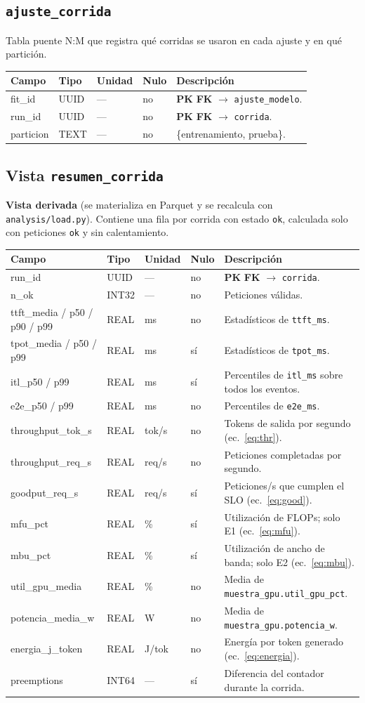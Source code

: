 \documentclass[11pt,a4paper]{article}
\makeatletter
\newcommand{\PK}{\textcolor{pkc}{\textbf{PK}}}
\newcommand{\FK}{\textcolor{fkc}{\textbf{FK}}}
\newenvironment{diccionario}{%
  \small
  \begin{longtable}{@{}>{\raggedright\ttfamily}p{3.4cm}>{\raggedright}p{2.2cm}>{\raggedright}p{1.6cm}p{0.9cm}>{\raggedright\arraybackslash}p{5.8cm}@{}}
  \toprule
  \normalfont\textbf{Campo} & \textbf{Tipo} & \textbf{Unidad} & \textbf{Nulo} & \textbf{Descripción}\\
  \midrule\endhead
  \bottomrule\endfoot
}{\end{longtable}}
\makeatother
\begin{document}
\subsection{\texttt{ajuste_corrida}}
Tabla puente N:M que registra qué corridas se usaron en cada ajuste y en qué partición.
\begin{diccionario}
fit_id & UUID & — & no & \PK{} \FK{} $\rightarrow$ \texttt{ajuste_modelo}.\\
run_id & UUID & — & no & \PK{} \FK{} $\rightarrow$ \texttt{corrida}.\\
particion & TEXT & — & no & \{entrenamiento, prueba\}.\\
\end{diccionario}

\subsection{Vista \texttt{resumen_corrida}}
\textcolor{vista}{\textbf{Vista derivada}} (se materializa en Parquet y se recalcula con \texttt{analysis/load.py}). Contiene una fila por corrida con estado \texttt{ok}, calculada solo con peticiones \texttt{ok} y sin calentamiento.
\begin{diccionario}
run_id & UUID & — & no & \PK{} \FK{} $\rightarrow$ \texttt{corrida}.\\
n_ok & INT32 & — & no & Peticiones válidas.\\
ttft_media / p50 / p90 / p99 & REAL & ms & no & Estadísticos de \texttt{ttft_ms}.\\
tpot_media / p50 / p99 & REAL & ms & sí & Estadísticos de \texttt{tpot_ms}.\\
itl_p50 / p99 & REAL & ms & sí & Percentiles de \texttt{itl_ms} sobre todos los eventos.\\
e2e_p50 / p99 & REAL & ms & no & Percentiles de \texttt{e2e_ms}.\\
throughput_tok_s & REAL & tok/s & no & Tokens de salida por segundo (ec.~\ref{eq:thr}).\\
throughput_req_s & REAL & req/s & no & Peticiones completadas por segundo.\\
goodput_req_s & REAL & req/s & sí & Peticiones/s que cumplen el SLO (ec.~\ref{eq:good}).\\
mfu_pct & REAL & \% & sí & Utilización de FLOPs; solo E1 (ec.~\ref{eq:mfu}).\\
mbu_pct & REAL & \% & sí & Utilización de ancho de banda; solo E2 (ec.~\ref{eq:mbu}).\\
util_gpu_media & REAL & \% & no & Media de \texttt{muestra_gpu.util_gpu_pct}.\\
potencia_media_w & REAL & W & no & Media de \texttt{muestra_gpu.potencia_w}.\\
energia_j_token & REAL & J/tok & no & Energía por token generado (ec.~\ref{eq:energia}).\\
preemptions & INT64 & — & sí & Diferencia del contador durante la corrida.\\
\end{diccionario}
\end{document}
